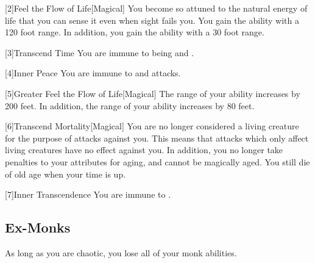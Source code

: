         [2]{Feel the Flow of Life}[Magical] You become so attuned to the natural energy of life that you can sense it even when sight fails you.
        You gain the  ability with a 120 foot range.
        In addition, you gain the  ability with a 30 foot range.

        [3]{Transcend Time} You are immune to being  and .

        [4]{Inner Peace} You are immune to  and  attacks.

        [5]{Greater Feel the Flow of Life}[Magical]
        The range of your  ability increases by 200 feet.
        In addition, the range of your  ability increases by 80 feet.

        [6]{Transcend Mortality}[Magical]
        You are no longer considered a living creature for the purpose of attacks against you.
        This means that attacks which only affect living creatures have no effect against you.
        In addition, you no longer take penalties to your attributes for aging, and cannot be magically aged.
        You still die of old age when your time is up.

        [7]{Inner Transcendence} You are immune to .



    \subsection{Ex-Monks}
        As long as you are chaotic, you lose all of your  monk abilities.

